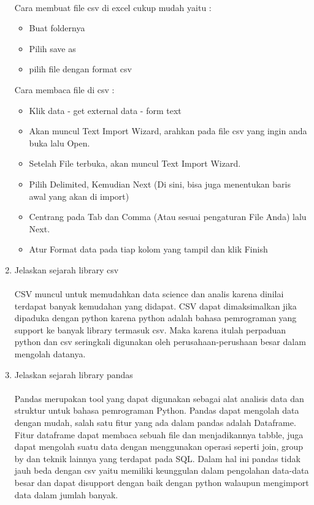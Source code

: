 \begin{enumerate}
\paragraph{} Cara membuat file csv di excel cukup mudah yaitu :
\begin{itemize}
	\item Buat foldernya
	\item Pilih save as
	\item pilih file dengan format csv
\end{itemize}
Cara membaca file di csv :
\begin{itemize}
	\item Klik data - get external data - form text
	\item Akan muncul Text Import Wizard, arahkan pada file csv yang ingin anda buka lalu Open.
	\item Setelah File terbuka, akan muncul Text Import Wizard.
	\item Pilih Delimited, Kemudian Next (Di sini, bisa juga menentukan baris awal yang akan di import)
	\item Centrang pada Tab dan Comma (Atau sesuai pengaturan File Anda) lalu Next.
	\item Atur Format data pada tiap kolom yang tampil dan klik Finish
\end{itemize}

\item Jelaskan sejarah library csv
\paragraph{} CSV muncul untuk memudahkan data science dan analis karena dinilai terdapat banyak kemudahan yang didapat. CSV dapat dimaksimalkan jika dipaduka dengan python karena python adalah bahasa pemrograman yang support ke banyak library termasuk csv. Maka karena itulah perpaduan python dan csv seringkali digunakan oleh perusahaan-perushaan besar dalam mengolah datanya.

\item Jelaskan sejarah library pandas
\paragraph{} Pandas merupakan tool yang dapat digunakan sebagai alat analisis data dan struktur untuk bahasa pemrograman Python. Pandas dapat mengolah data dengan mudah, salah satu fitur yang ada dalam pandas adalah Dataframe. Fitur dataframe dapat membaca sebuah file dan menjadikannya tabble, juga dapat mengolah suatu data dengan menggunakan operasi seperti join, group by dan teknik lainnya yang terdapat pada SQL. Dalam hal ini pandas tidak jauh beda dengan csv yaitu memiliki keunggulan dalam pengolahan data-data besar dan dapat disupport dengan baik dengan python walaupun mengimport data dalam jumlah banyak.


\end{enumerate}
